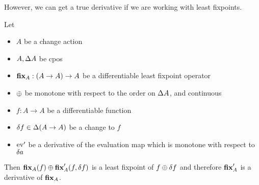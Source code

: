 However, we can get a true derivative if we are working with least fixpoints.

\begin{thm}
\label{thm:leastFixpointDiff}
  Let 
  \begin{itemize}
    \item $A$ be a change action 
    \item $A, \Delta A$ be cpos
    \item$\textbf{fix}_A : (A \rightarrow A) \rightarrow A$ be a differentiable
      least fixpoint operator
    \item $\oplus$ be monotone with respect to the order on $\Delta A$, and continuous
    \item $f: A \rightarrow A$ be a differentiable function
    \item $\delta f \in \Delta (A \rightarrow A)$ be a change to $f$
    \item $\operatorname{ev}'$ be a derivative of the evaluation map which is monotone
      with respect to $\delta a$
  \end{itemize}

  Then $\textbf{fix}_A(f) \oplus \textbf{fix}_A'(f, \delta f)$ is a least
  fixpoint of $f \oplus \delta f$ and therefore $\textbf{fix}_A'$ is a derivative of $\textbf{fix}_A$.
\end{thm}
\ifproofs
